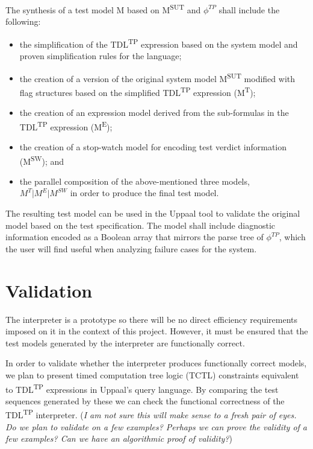 \documentclass[12pt,oneside,a4paper,draft,notitlepage]{article}
\begin{document}
	\par The synthesis of a test model M based on M\textsuperscript{SUT} and $\phi^{TP}$ shall include the following:
	\begin{itemize}
		\item the simplification of the TDL\textsuperscript{TP} expression based on the system model and proven simplification rules for the language;
		\item the creation of a version of the original system model M\textsuperscript{SUT} modified with flag structures based on the simplified TDL\textsuperscript{TP} expression (M\textsuperscript{T});
		\item the creation of an expression model derived from the sub-formulas in the TDL\textsuperscript{TP} expression (M\textsuperscript{E});
		\item the creation of a stop-watch model for encoding test verdict information (M\textsuperscript{SW}); and
		\item the parallel composition of the above-mentioned three models, \\
		$M^{T} \vert M^{E} \vert M^{SW}$ in order to produce the final test model.
	\end{itemize}

	\par The resulting test model can be used in the Uppaal tool to validate the original model based on the test specification. The model shall include diagnostic information encoded as a Boolean array that mirrors the parse tree of $\phi^{TP}$, which the user will find useful when analyzing failure cases for the system.

	\section*{Validation}
	\par The interpreter is a prototype so there will be no direct efficiency requirements imposed on it in the context of this project. However, it must be ensured that the test models generated by the interpreter are functionally correct.

	\bigskip

	\par In order to validate whether the interpreter produces functionally correct models, we plan to present timed computation tree logic (TCTL) constraints equivalent to TDL\textsuperscript{TP} expressions in Uppaal's query language. By comparing the test sequences generated by these we can check the functional correctness of the TDL\textsuperscript{TP} interpreter. (\textit{I am not sure this will make sense to a fresh pair of eyes. Do we plan to validate on a few examples? Perhaps we can prove the validity of a few examples? Can we have an algorithmic proof of validity?})
\end{document}
